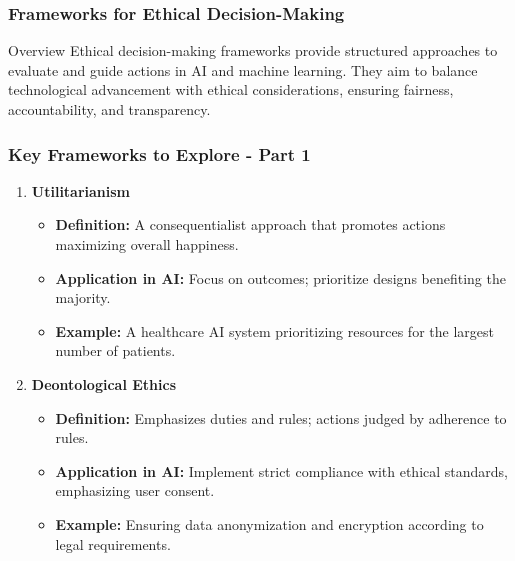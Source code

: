 \documentclass{beamer}
\begin{document}
\begin{frame}[fragile]
    \frametitle{Frameworks for Ethical Decision-Making}
    \begin{block}{Overview}
        Ethical decision-making frameworks provide structured approaches to evaluate and guide actions in AI and machine learning. They aim to balance technological advancement with ethical considerations, ensuring fairness, accountability, and transparency.
    \end{block}
\end{frame}

\begin{frame}[fragile]
    \frametitle{Key Frameworks to Explore - Part 1}
    \begin{enumerate}
        \item \textbf{Utilitarianism}
            \begin{itemize}
                \item \textbf{Definition:} A consequentialist approach that promotes actions maximizing overall happiness.
                \item \textbf{Application in AI:} Focus on outcomes; prioritize designs benefiting the majority.
                \item \textbf{Example:} A healthcare AI system prioritizing resources for the largest number of patients.
            \end{itemize}
        
        \item \textbf{Deontological Ethics}
            \begin{itemize}
                \item \textbf{Definition:} Emphasizes duties and rules; actions judged by adherence to rules.
                \item \textbf{Application in AI:} Implement strict compliance with ethical standards, emphasizing user consent.
                \item \textbf{Example:} Ensuring data anonymization and encryption according to legal requirements.
            \end{itemize}
    \end{enumerate}
\end{frame}
\end{document}

